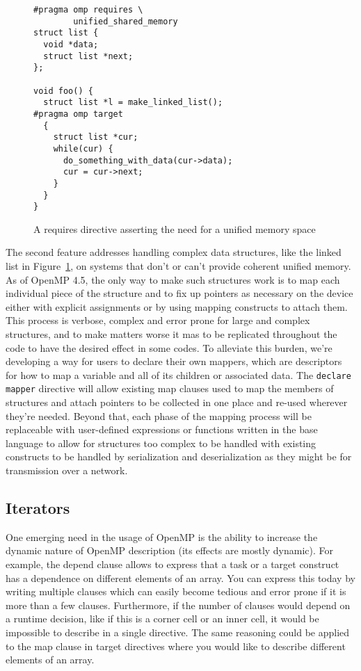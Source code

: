 \begin{figure}
\begin{verbatim}
#pragma omp requires \
        unified_shared_memory
struct list {
  void *data;
  struct list *next;
};

void foo() {
  struct list *l = make_linked_list();
#pragma omp target
  {
    struct list *cur;
    while(cur) {
      do_something_with_data(cur->data);
      cur = cur->next;
    }
  }
}
\end{verbatim}
\caption{A requires directive asserting the need for a unified memory space}
\label{fig:unified}
\end{figure}

The second feature addresses handling complex data structures, like the linked
list in Figure~\ref{fig:unified}, on systems that don't or can't provide
coherent unified memory.  As of OpenMP 4.5, the only way to make such structures
work is to map each individual piece of the structure and to fix up pointers as
necessary on the device either with explicit assignments or by using mapping
constructs to attach them.  This process is verbose, complex and error prone for
large and complex structures, and to make matters worse it mas to be replicated
throughout the code to have the desired effect in some codes.  To alleviate this
burden, we're developing a way for users to declare their own mappers, which are
descriptors for how to map a variable and all of its children or associated
data.  The \texttt{declare mapper} directive will allow existing map clauses
used to map the members of structures and attach pointers to be collected in
one place and re-used wherever they're needed.  Beyond that, each phase of the
mapping process will be replaceable with user-defined expressions or functions
written in the base language to allow for structures too complex to be handled
with existing constructs to be handled by serialization and deserialization as
they might be for transmission over a network.


\subsection{Iterators}
\label{sub:iterators}

One emerging need in the usage of OpenMP is the ability to increase the dynamic
nature of OpenMP description (its effects are mostly dynamic). For example, the
depend clause allows to express that a task or a target construct has
a dependence on different elements of an array. You can express this today by
writing multiple clauses which can easily become tedious and error prone if it
is more than a few clauses. Furthermore, if the number of clauses would depend
on a runtime decision, like if this is a corner cell or an inner cell, it would
be impossible to describe in a single directive. The same reasoning could be
applied to the map clause in target directives where you would like to describe
different elements of an array.
   
